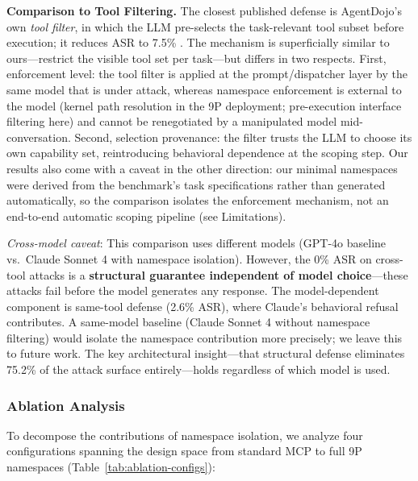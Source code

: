 \documentclass[acmsmall,screen,review]{acmart}
\begin{document}
\textbf{Comparison to Tool Filtering.} The closest published defense is AgentDojo's own \textit{tool filter}, in which the LLM pre-selects the task-relevant tool subset before execution; it reduces ASR to 7.5\% \cite{debenedetti2024agentdojo}. The mechanism is superficially similar to ours---restrict the visible tool set per task---but differs in two respects. First, enforcement level: the tool filter is applied at the prompt/dispatcher layer by the same model that is under attack, whereas namespace enforcement is external to the model (kernel path resolution in the 9P deployment; pre-execution interface filtering here) and cannot be renegotiated by a manipulated model mid-conversation. Second, selection provenance: the filter trusts the LLM to choose its own capability set, reintroducing behavioral dependence at the scoping step. Our results also come with a caveat in the other direction: our minimal namespaces were derived from the benchmark's task specifications rather than generated automatically, so the comparison isolates the enforcement mechanism, not an end-to-end automatic scoping pipeline (see Limitations).

\textit{Cross-model caveat}: This comparison uses different models (GPT-4o baseline vs.\ Claude Sonnet 4 with namespace isolation). However, the 0\% ASR on cross-tool attacks is a \textbf{structural guarantee independent of model choice}---these attacks fail before the model generates any response. The model-dependent component is same-tool defense (2.6\% ASR), where Claude's behavioral refusal contributes. A same-model baseline (Claude Sonnet 4 without namespace filtering) would isolate the namespace contribution more precisely; we leave this to future work. The key architectural insight---that structural defense eliminates 75.2\% of the attack surface entirely---holds regardless of which model is used.

\subsubsection{Ablation Analysis}
\label{sec:ablation}

To decompose the contributions of namespace isolation, we analyze four configurations spanning the design space from standard MCP to full 9P namespaces (Table~\ref{tab:ablation-configs}):
\end{document}
